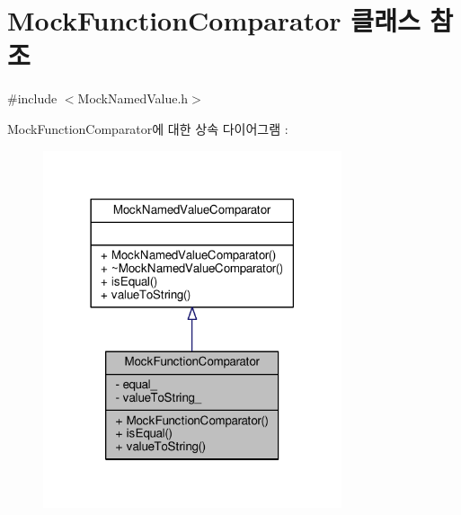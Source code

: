 \hypertarget{class_mock_function_comparator}{}\section{Mock\+Function\+Comparator 클래스 참조}
\label{class_mock_function_comparator}


{\ttfamily \#include $<$Mock\+Named\+Value.\+h$>$}



Mock\+Function\+Comparator에 대한 상속 다이어그램 \+: 
\nopagebreak
\begin{figure}[H]
\begin{center}
\leavevmode
\includegraphics[width=249pt]{class_mock_function_comparator__inherit__graph}
\end{center}
\end{figure}


